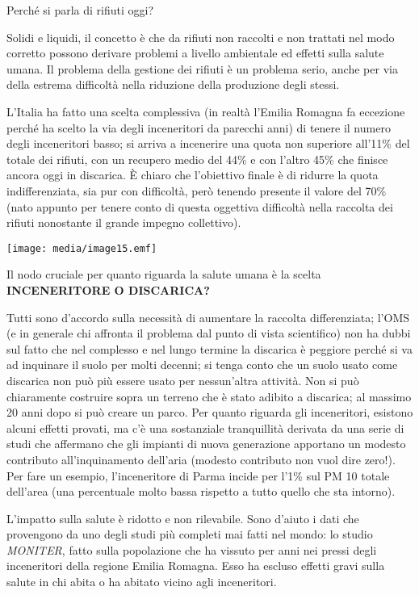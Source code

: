 \documentclass[]{article}
\begin{document}
Perché si parla di rifiuti oggi?

Solidi e liquidi, il concetto è che da rifiuti non raccolti e non
trattati nel modo corretto possono derivare problemi a livello
ambientale ed effetti sulla salute umana. Il problema della gestione dei
rifiuti è un problema serio, anche per via della estrema difficoltà
nella riduzione della produzione degli stessi.

L'Italia ha fatto una scelta complessiva (in realtà l'Emilia Romagna fa
eccezione perché ha scelto la via degli inceneritori da parecchi anni)
di tenere il numero degli inceneritori basso; si arriva a incenerire una
quota non superiore all'11\% del totale dei rifiuti, con un recupero
medio del 44\% e con l'altro 45\% che finisce ancora oggi in discarica.
È chiaro che l'obiettivo finale è di ridurre la quota indifferenziata,
sia pur con difficoltà, però tenendo presente il valore del 70\% (nato
appunto per tenere conto di questa oggettiva difficoltà nella raccolta
dei rifiuti nonostante il grande impegno collettivo).

\texttt{[image: media/image15.emf]}

Il nodo cruciale per quanto riguarda la salute umana è la scelta
\textbf{INCENERITORE O DISCARICA?}

Tutti sono d'accordo sulla necessità di aumentare la raccolta
differenziata; l'OMS (e in generale chi affronta il problema dal punto
di vista scientifico) non ha dubbi sul fatto che nel complesso e nel
lungo termine la discarica è peggiore perché si va ad inquinare il suolo
per molti decenni; si tenga conto che un suolo usato come discarica non
può più essere usato per nessun'altra attività. Non si può chiaramente
costruire sopra un terreno che è stato adibito a discarica; al massimo
20 anni dopo si può creare un parco. Per quanto riguarda gli
inceneritori, esistono alcuni effetti provati, ma c'è una sostanziale
tranquillità derivata da una serie di studi che affermano che gli
impianti di nuova generazione apportano un modesto contributo
all'inquinamento dell'aria (modesto contributo non vuol dire zero!). Per
fare un esempio, l'inceneritore di Parma incide per l'1\% sul PM 10
totale dell'area (una percentuale molto bassa rispetto a tutto quello
che sta intorno).

L'impatto sulla salute è ridotto e non rilevabile. Sono d'aiuto i dati
che provengono da uno degli studi più completi mai fatti nel mondo: lo
studio \emph{MONITER}, fatto sulla popolazione che ha vissuto per anni
nei pressi degli inceneritori della regione Emilia Romagna. Esso ha
escluso effetti gravi sulla salute in chi abita o ha abitato vicino agli
inceneritori.
\end{document}

